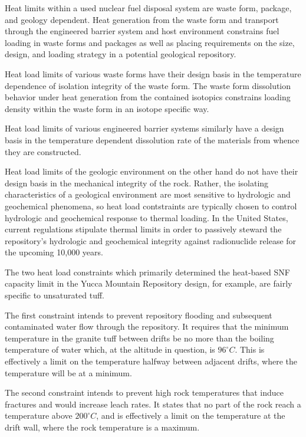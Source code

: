 Heat limits within a used nuclear fuel disposal system are waste form, 
package, and geology dependent. Heat generation from the waste form 
and transport through the engineered barrier system and host 
environment constrains fuel loading in waste forms and packages as 
well as placing requirements on the size, design, and loading strategy 
in a potential geological repository.

Heat load limits of various waste forms have their design basis in the 
temperature dependence of isolation integrity of the waste form. The 
waste form dissolution behavior under heat generation from the 
contained isotopics constrains loading density within the waste form 
in an isotope specific way.  

Heat load limits of various engineered barrier systems similarly have 
a design basis in the temperature dependent dissolution rate of the 
materials from whence they are constructed.  

Heat load limits of the geologic environment on the other hand do not  
have their design basis in the mechanical integrity of the rock.  
Rather, the isolating characteristics of a geological environment are 
most sensitive to hydrologic and geochemical phenomena, so heat load 
contstraints are typically chosen to control hydrologic and 
geochemical response to thermal loading. In the United States, current 
regulations stipulate thermal limits in order to passively steward the 
repository's hydrologic and geochemical integrity against radionuclide  
release for the upcoming 10,000 years.

The two heat load constraints which primarily determined the 
heat-based SNF capacity limit in the Yucca Mountain Repository design, 
for example, are fairly specific to unsaturated tuff. 

The first constraint intends to prevent repository flooding and 
subsequent contaminated water flow through the repository. It requires 
that the minimum temperature in the granite tuff between drifts be no 
more than the boiling temperature of water which, at the altitude in 
question, is $96^{\circ}C$. This is effectively a limit on the 
temperature halfway between adjacent drifts, where the temperature 
will be at a minimum.

The second constraint intends to prevent high rock temperatures that 
induce fractures and would increase leach rates. It states that no 
part of the rock reach a temperature above $200^{\circ}C$, and is 
effectively a limit on the temperature at the drift wall, where the 
rock temperature is a maximum.  

